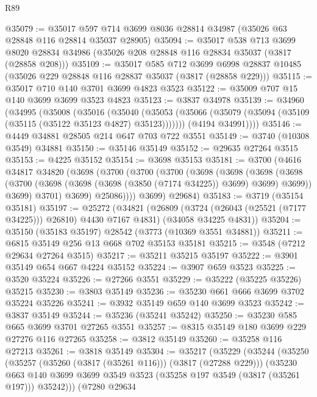 \begin{lexlean}{R89}
\begin{coremodule}
@35079 := @35017 @597 @714 @3699 @8036 @28814 @34987 (@35026 @63 @28848 @116 @28814 @35037 @28905)
@35094 := @35017
    @538
    @713
    @3699
    @8020
    @28834
    @34986
    (@35026 @208 @28848 @116 @28834 @35037 (@3817 (@28858 @208)))
@35109 := @35017
    @585
    @712
    @3699
    @6998
    @28837
    @10485
    (@35026 @229 @28848 @116 @28837 @35037 (@3817 (@28858 @229)))
@35115 := @35017 @710 @140 @3701 @3699 @4823 @3523
@35122 := @35009 @707 @15 @140 @3699 @3699 @3523 @4823
@35123 := @3837 @34978
@35139 := @34960
    (@34995
      (@35008
        (@35016
          (@35040
            (@35053 (@35066 (@35079 (@35094 (@35109 (@35115 (@35122 @35123 @4827) @35123)))))))
          (@4194 @34991))))
@35146 := @4449 @34881 @28505 @214 @647 @703 @722 @3551
@35149 := @3740 (@10308 @3549) @34881
@35150 := @35146 @35149
@35152 := @29635 @27264 @3515
@35153 := @4225 @35152
@35154 := @3698 @35153
@35181 := @3700
    (@4616
      @34817
      @34820
      (@3698
        (@3700
          (@3700
            (@3700
              (@3698
                (@3698
                  (@3698
                    (@3698
                      (@3700 (@3698 (@3698 (@3698 (@3850 (@7174 @34225)) @3699) @3699) @3699))
                      @3699)
                    @3701)
                  @3699)
                @25086))))
        @3699)
      @29684)
@35183 := @3719 (@35154 @35181)
@35197 := @25272
    (@34821
      (@26809 (@3724 (@26043 (@25521 (@7177 @34225))) @26810) @4430 @7167 @4831)
      (@34058 @34225 @4831))
@35204 := @35150 (@35183 @35197) @28542 (@3773 (@10369 @3551 @34881))
@35211 := @6815 @35149 @256 @13 @668 @702 @35153 @35181
@35215 := @3548 (@7212 @29634 @27264 @3515)
@35217 := @35211 @35215 @35197
@35222 := @3901 @35149 @654 @667 @4224 @35152
@35224 := @3907 @659 @3523
@35225 := @3520 @35224
@35226 := @27266 @3551
@35229 := @35222 (@35225 @35226) @35215
@35230 := @3803 @35149
@35236 := @35230 @661 @666 @3699 @3702 @35224 @35226
@35241 := @3932 @35149 @659 @140 @3699 @3523
@35242 := @3837 @35149
@35244 := @35236 (@35241 @35242)
@35250 := @35230 @585 @665 @3699 @3701 @27265 @3551
@35257 := @8315 @35149 @180 @3699 @229 @27276 @116 @27265
@35258 := @3812 @35149
@35260 := @35258 @116 @27213
@35261 := @3818 @35149
@35304 := @35217
    (@35229
      (@35244
        (@35250
          (@35257 (@35260 (@3817 (@35261 @116))) (@3817 (@27288 @229)))
          (@35230
            @663
            @140
            @3699
            @3699
            @3549
            @3523
            (@35258 @197 @3549 (@3817 (@35261 @197)))
            @35242)))
      (@7280
        @29634

\end{coremodule}
\end{lexlean}
